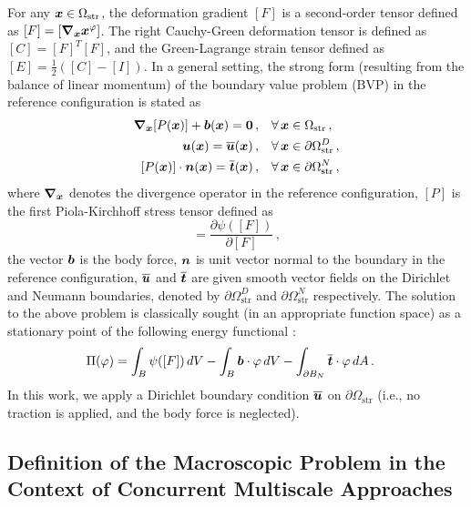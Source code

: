For any ${\boldsymbol{x}} \in \Omega_\text{str}$, the deformation gradient $[F]$ is a second-order tensor defined as $[F] = [\boldsymbol{\nabla}_{{\boldsymbol{x}}} {\boldsymbol{x}}^\varphi]$. The right Cauchy-Green deformation tensor is defined as $[C] = [F]^T [F]$, and the Green-Lagrange strain tensor defined as $[E] = \frac{1}{2}([C] - [I])$. In a general setting, the strong form (resulting from the balance of linear momentum) of the boundary value problem (BVP) in the reference configuration is stated as \cite{ciarlet}
\begin{align}
    \boldsymbol{\nabla}_{\bfx} [P(\bfx)] + \bfb(\bfx)  = \mathbf{0}\,,& \quad \forall\,\bfx \in \Omega_\text{str}\,, \label{eq: stress divergence structural}\\
    \bfu(\bfx) = \overline{\bfu}(\bfx)\,,& \quad \forall\, \bfx \in \partial \Omega_\text{str}^D\,,\\
    [P(\bfx)] \cdot \bfn(\bfx) = \overline{\bft}(\bfx)\,,& \quad \forall\, \bfx \in \partial \Omega_\text{str}^N\,,
\end{align}
where $\boldsymbol{\nabla}_{{\boldsymbol{x}}}$ denotes the divergence operator in the reference configuration, $[P]$ is the first Piola-Kirchhoff stress tensor defined as
\begin{equation}
    [P] = \frac{\partial \psi([F])}{\partial [F]}\,,
\end{equation}
the vector ${\boldsymbol{b}}$ is the body force, ${\boldsymbol{n}}$ is unit vector normal to the boundary in the reference configuration, $\overline{{\boldsymbol{u}}}$ and $\overline{{\boldsymbol{t}}}$ are given smooth vector fields on the Dirichlet and Neumann boundaries, denoted by $\partial \Omega_\text{str}^D$ and $\partial \Omega_\text{str}^N$ respectively. The solution to the above problem is classically sought (in an appropriate function space) as a stationary point of the following energy functional \cite{ciarlet,wriggers2008nonlinear,bonet_wood_2008}:
\begin{align}
    \Pi(\varphi) &= \int_B \psi([F]) \, dV - \int_{B} {\boldsymbol{b}} \cdot \varphi\,dV - \int_{\partial B_N} \overline{{\boldsymbol{t}}} \cdot \varphi\,dA\,.
\end{align}
In this work, we apply a Dirichlet boundary condition $\overline{{\boldsymbol{u}}}$ on $\partial \Omega_\text{str}$ (i.e., no traction is applied, and the body force is neglected).

\subsection{Definition of the Macroscopic Problem in the Context of Concurrent Multiscale Approaches}\label{subsec:def-mac-pb}

